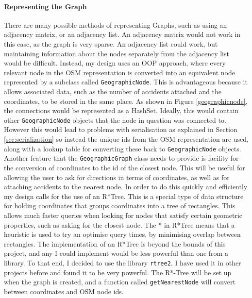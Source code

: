 \documentclass[11pt,twoside,a4paper]{article}
\begin{document}
\paragraph{Representing the Graph}
There are many possible methods of representing Graphs, such as using an adjacency matrix, or an adjacency list. An adjacency matrix would not work in this case, as the graph is very sparse. An adjacency list could work, but maintaining information about the nodes 
separately from the adjacency list would be difficult. Instead, my design uses an OOP approach, where every relevant node in the OSM representation is converted into an equivalent node represented by a subclass called \texttt{GeographicNode}.
This is advantageous because it allows associated data, such as the number of accidents attached and the coordinates, to be stored in the same place. As shown in Figure \ref{geographicnode}, the connections would be represented as a HashSet. Ideally, this would contain
other \texttt{GeographicNode} objects that the node in question was connected to. However this would lead to problems with serialisation as explained in Section \ref{sec:serialization} so instead the unique ids from the OSM representation are used,
along with a lookup table for converting these back to \texttt{GeographicNode} objects.\\
Another feature that the \texttt{GeographicGraph} class needs to provide is facility for the conversion of coordinates to the id of the closest node. This will be useful for allowing the user to ask for directions in terms of coordinates,
as well as for attaching accidents to the nearest node.
In order to do this quickly and efficiently my design calls for the use of an R*Tree\cite{Beckmann1990}. This is a special type of data structure for holding coordinates that groups coordinates into a tree of rectangles. This allows much faster queries when looking for nodes that satisfy certain geometric properties, such as asking for the closest node.
The * in R*Tree means that a heuristic is used to try an optimise query times, by minimising overlap between rectangles. 
The implementation of an R*Tree is beyond the bounds of this project, and any I could implement would be less powerful than one from a library. To that end, I decided to use the library \texttt{rtree2}\cite{rtree}. I have used it in other projects before and found it to be very powerful. The R*-Tree will be set up when the graph is created, and a 
function called \texttt{getNearestNode} will convert between coordinates and OSM node ids. 
\end{document}
